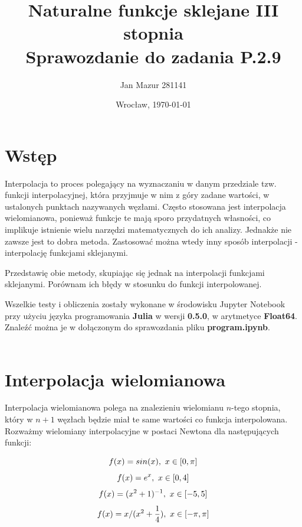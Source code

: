 \documentclass{article}
\author{Jan Mazur 281141}
\date{Wrocław, \today}
\title{\textbf{Naturalne funkcje sklejane III stopnia} \\ Sprawozdanie do zadania P.2.9	}
\begin{document}
\maketitle

\section{Wstęp}

Interpolacja to proces polegający na wyznaczaniu w danym przedziale tzw. funkcji interpolacyjnej, która przyjmuje w nim z góry zadane wartości, w ustalonych punktach nazywanych węzłami. \cite{wikipedia_pl}
Często stosowana jest interpolacja wielomianowa, ponieważ  funkcje te mają sporo przydatnych własności, co implikuje istnienie wielu narzędzi matematycznych do ich analizy. Jednakże nie zawsze jest to dobra metoda.
Zastosować można wtedy inny sposób interpolacji - interpolację funkcjami sklejanymi.

Przedstawię obie metody, skupiając się jednak na interpolacji funkcjami sklejanymi. Porównam ich błędy w stosunku do funkcji interpolowanej.

Wszelkie testy i obliczenia zostały wykonane w środowisku Jupyter Notebook przy użyciu języka programowania \textbf{Julia} w wersji \textbf{0.5.0}, w arytmetyce \textbf{Float64}.
Znaleźć można je w dołączonym do sprawozdania pliku \textbf{program.ipynb}.\\\\

\section{Interpolacja wielomianowa}
Interpolacja wielomianowa polega na znalezieniu wielomianu $n$-tego stopnia, który w $n+1$ węzłach będzie miał te same wartości co funkcja interpolowana. Rozważmy wielomiany interpolacyjne w postaci Newtona dla następujących funkcji:

\begin{equation}\label{fun1}
	f(x) = sin(x), \textnormal{ } x \in [0,\pi]
\end{equation}
\begin{equation}\label{fun2}
	f(x) = e^x, \textnormal{ } x \in [0,4]
\end{equation}
\begin{equation}\label{fun3}
	f(x) = (x^{2}+1)^{-1}, \textnormal{ } x \in [-5,5]
\end{equation}
\begin{equation}\label{fun4}
	f(x) = x/(x^{2} + \frac{1}{4}), \textnormal{ } x \in [-\pi,\pi]
\end{equation}
\end{document}
